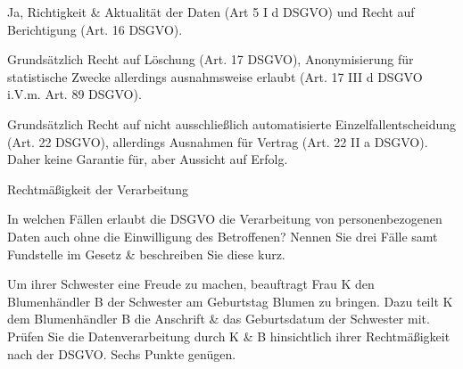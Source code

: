 \documentclass{exercisesheet}
\begin{document}
\begin{solutions}
  \item Ja, Richtigkeit \& Aktualität der Daten (Art 5 I d DSGVO) und Recht auf Berichtigung (Art. 16 DSGVO).
  \item Grundsätzlich Recht auf Löschung (Art. 17 DSGVO), Anonymisierung für statistische Zwecke allerdings ausnahmsweise erlaubt (Art. 17 III d DSGVO i.V.m. Art. 89 DSGVO).
  \item Grundsätzlich Recht auf nicht ausschließlich automatisierte Einzelfallentscheidung (Art. 22 DSGVO), allerdings Ausnahmen für Vertrag (Art. 22 II a DSGVO). Daher keine Garantie für, aber Aussicht auf Erfolg.
\end{solutions}

\begin{exercises}{Rechtmäßigkeit der Verarbeitung}
\item In welchen Fällen erlaubt die DSGVO die Verarbeitung von personenbezogenen Daten auch ohne die Einwilligung des Betroffenen? Nennen Sie drei Fälle samt Fundstelle im Gesetz \& beschreiben Sie diese kurz.
\item Um ihrer Schwester eine Freude zu machen, beauftragt Frau K den Blumenhändler B der Schwester am Geburtstag Blumen zu bringen. Dazu teilt K dem Blumenhändler B die Anschrift \& das Geburtsdatum der Schwester mit. Prüfen Sie die Datenverarbeitung durch K \& B hinsichtlich ihrer Rechtmäßigkeit nach der DSGVO. Sechs Punkte genügen.
\end{exercises}
\end{document}
